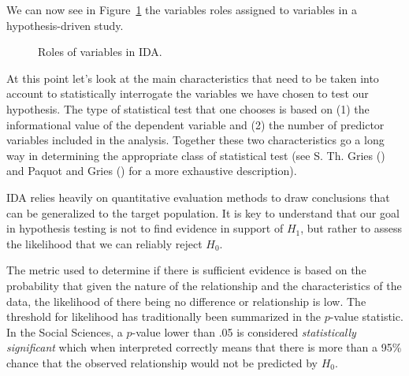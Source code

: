 \documentclass[
  letterpaper,
  DIV=11,
  numbers=noendperiod]{scrreprt}
\theoremstyle{definition}
\theoremstyle{remark}
\begin{document}
We can now see in Figure~\ref{fig-aa-ida-variables} the variables roles
assigned to variables in a hypothesis-driven study.

\begin{figure}[H]


\caption{\label{fig-aa-ida-variables}Roles of variables in IDA.}

\end{figure}%

At this point let's look at the main characteristics that need to be
taken into account to statistically interrogate the variables we have
chosen to test our hypothesis. The type of statistical test that one
chooses is based on (1) the informational value of the dependent
variable and (2) the number of predictor variables included in the
analysis. Together these two characteristics go a long way in
determining the appropriate class of statistical test (see S. Th. Gries
() and Paquot and Gries
() for a more exhaustive description).

IDA relies heavily on quantitative evaluation methods to draw
conclusions that can be generalized to the target population. It is key
to understand that our goal in hypothesis testing is not to find
evidence in support of \(H_1\), but rather to assess the likelihood that
we can reliably reject \(H_0\).

The metric used to determine if there is sufficient evidence is based on
the probability that given the nature of the relationship and the
characteristics of the data, the likelihood of there being no difference
or relationship is low. The threshold for likelihood has traditionally
been summarized in the \(p\)-value statistic. In the Social Sciences, a
\(p\)-value lower than .05 is considered \emph{statistically
significant} which when interpreted correctly means that there is more
than a 95\% chance that the observed relationship would not be predicted
by \(H_0\).
\end{document}
